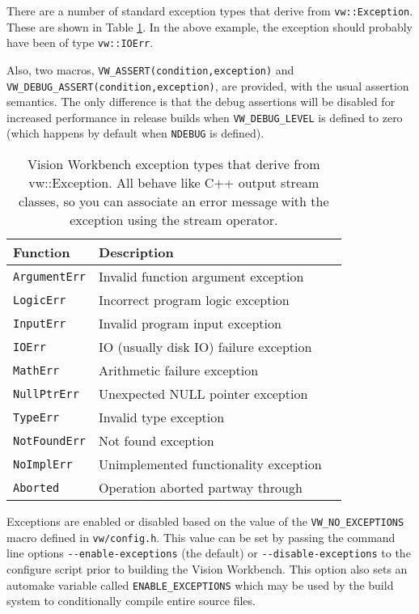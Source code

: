 There are a number of standard exception types that derive from
\verb#vw::Exception#.  These are shown in Table
\ref{tbl:exception-types}.  In the above example, the exception should
probably have been of type \verb#vw::IOErr#.  

Also, two macros, \verb#VW_ASSERT(condition,exception)# and
\verb#VW_DEBUG_ASSERT(condition,exception)#, are provided, with the
usual assertion semantics.  The only difference is that the debug
assertions will be disabled for increased performance in release
builds when \verb#VW_DEBUG_LEVEL# is defined to zero (which happens by
default when \verb#NDEBUG# is defined).

\begin{table}[t]\begin{centering}
\begin{tabular}{|l|l|l|} \hline
Function & Description \\ \hline \hline
\verb#ArgumentErr# & Invalid function argument exception \\ \hline
\verb#LogicErr# & Incorrect program logic exception \\ \hline
\verb#InputErr# & Invalid program input exception \\ \hline
\verb#IOErr# & IO (usually disk IO) failure exception \\ \hline
\verb#MathErr# & Arithmetic failure exception \\ \hline
\verb#NullPtrErr# & Unexpected NULL pointer exception\\ \hline
\verb#TypeErr# & Invalid type exception \\ \hline
\verb#NotFoundErr# & Not found exception \\ \hline
\verb#NoImplErr# & Unimplemented functionality exception \\ \hline
\verb#Aborted# & Operation aborted partway through \\ \hline

\end{tabular}
\caption{Vision Workbench exception types that derive from
  vw::Exception.  All behave like C++ output stream classes, so you
  can associate an error message with the exception using the
  stream operator.}
\label{tbl:exception-types}
\end{centering}\end{table}

Exceptions are enabled or disabled based on the value of the
\verb#VW_NO_EXCEPTIONS# macro defined in \verb#vw/config.h#.  This
value can be set by passing the command line options
\verb#--enable-exceptions# (the default) or \verb#--disable-exceptions#
to the configure script prior to building the Vision Workbench.  This
option also sets an automake variable called \verb#ENABLE_EXCEPTIONS#
which may be used by the build system to conditionally compile entire
source files.

